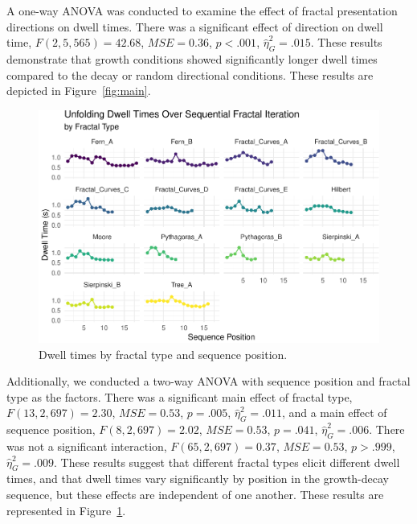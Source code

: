 \documentclass[english,jou]{apa6}
\begin{document}
A one-way ANOVA was conducted to examine the effect of fractal presentation directions on dwell times. There was a significant effect of direction on dwell time, \(F(2, 5,565) = 42.68\), \(\mathit{MSE} = 0.36\), \(p < .001\), \(\hat{\eta}^2_G = .015\). These results demonstrate that growth conditions showed significantly longer dwell times compared to the decay or random directional conditions. These results are depicted in Figure~\ref{fig:main}.

\begin{figure}
\centering
\includegraphics{paper_papaja_files/figure-latex/ftfig-1.pdf}
\caption{\label{fig:ftfig}Dwell times by fractal type and sequence position.}
\end{figure}

Additionally, we conducted a two-way ANOVA with sequence position and fractal type as the factors. There was a significant main effect of fractal type, \(F(13, 2,697) = 2.30\), \(\mathit{MSE} = 0.53\), \(p = .005\), \(\hat{\eta}^2_G = .011\), and a main effect of sequence position, \(F(8, 2,697) = 2.02\), \(\mathit{MSE} = 0.53\), \(p = .041\), \(\hat{\eta}^2_G = .006\). There was not a significant interaction, \(F(65, 2,697) = 0.37\), \(\mathit{MSE} = 0.53\), \(p > .999\), \(\hat{\eta}^2_G = .009\). These results suggest that different fractal types elicit different dwell times, and that dwell times vary significantly by position in the growth-decay sequence, but these effects are independent of one another. These results are represented in Figure~\ref{fig:ftfig}.
\end{document}
